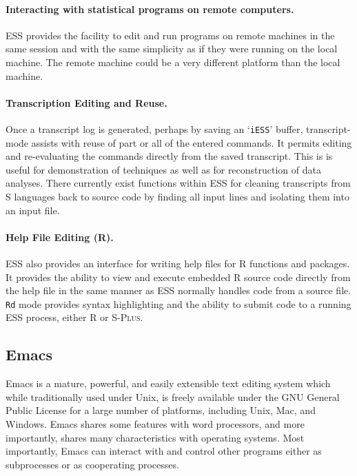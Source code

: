 \documentclass{article}
\newcommand*{\Splus}{\textsc{S-Plus}}
\newcommand{\stexttt}[1]{{\small\texttt{#1}}}
\newcommand{\file}[1]{`\stexttt{#1}'}
\begin{document}
\paragraph{Interacting with statistical programs on remote computers.}
ESS provides the facility to edit and run programs on remote machines
in the same session and with the same simplicity as if they were
running on the local machine.  The remote machine could be a very
different platform than the local machine.

\paragraph{Transcription Editing and Reuse.}
Once a transcript log is generated, perhaps by saving an \file{iESS}
buffer, transcript-mode assists with reuse of part or all of the
entered commands.  It permits editing and re-evaluating the commands
directly from the saved transcript.  This is is useful for
demonstration of techniques as well as for reconstruction of data
analyses.  There currently exist functions within ESS for cleaning
transcripts from S languages back to source code by finding all input
lines and isolating them into an input file.

\paragraph{Help File Editing (R).}
ESS also provides an interface for writing help files for R functions
and packages.  It provides the ability to view and execute embedded R
source code directly from the help file in the same manner as ESS
normally handles code from a source file.  \stexttt{Rd} mode provides
syntax highlighting and the ability to submit code to a running ESS
process, either R or \Splus.

\subsection{Emacs}
\label{sec:ESS:emacs}

Emacs \citep{RMS:2000} is a mature, powerful, and easily extensible
text editing system which while traditionally used under Unix, is
freely available under the GNU General Public License for a large
number of platforms, including Unix, Mac, and Windows.  Emacs shares
some features with word processors, and more importantly, shares many
characteristics with operating systems.  Most importantly, Emacs can
interact with and control other programs either as subprocesses or as
cooperating processes.
\end{document}
